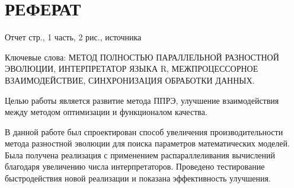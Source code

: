 \chapter*{РЕФЕРАТ}

Отчет \pageref{LastPage} стр., 1 часть, 2 рис.,  источника

Ключевые слова:
МЕТОД ПОЛНОСТЬЮ ПАРАЛЛЕЛЬНОЙ РАЗНОСТНОЙ ЭВОЛЮЦИИ,
ИНТЕРПРЕТАТОР ЯЗЫКА R,
МЕЖПРОЦЕССОРНОЕ ВЗАИМОДЕЙСТВИЕ,
СИНХРОНИЗАЦИЯ ОБРАБОТКИ ДАННЫХ.

Целью работы является развитие
метода ППРЭ,
улучшение взаимодействия между методом оптимизации
и функционалом качества.

В данной работе был спроектирован
способ увеличения производительности
метода разностной эволюции
для поиска параметров математических моделей.
Была получена реализация
с применением распараллеливания вычислений
благодаря увеличению числа интерпретаторов.
Проведено тестирование быстродействия
новой реализации и показана эффективность улучшения.

